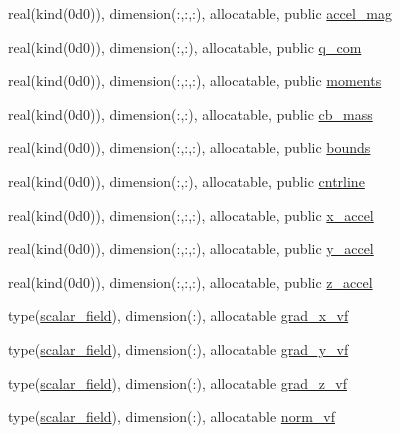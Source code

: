\begin{DoxyCompactItemize}
\item 
real(kind(0d0)), dimension(\+:,\+:,\+:), allocatable, public \hyperlink{namespacem__data__output_a1ccababc9891f8a719df1c52b49e969a}{accel\+\_\+mag}
\item 
real(kind(0d0)), dimension(\+:,\+:), allocatable, public \hyperlink{namespacem__data__output_ac5b476661d64159fdcd7364715495f30}{q\+\_\+com}
\item 
real(kind(0d0)), dimension(\+:,\+:,\+:), allocatable, public \hyperlink{namespacem__data__output_abd8505e33c0dce0f0aba7e27ae53bef5}{moments}
\item 
real(kind(0d0)), dimension(\+:,\+:), allocatable, public \hyperlink{namespacem__data__output_a775b8128a9261b4d095f9132508d309f}{cb\+\_\+mass}
\item 
real(kind(0d0)), dimension(\+:,\+:,\+:), allocatable, public \hyperlink{namespacem__data__output_a1e7a93a0d32bbc7c691381689771b6f9}{bounds}
\item 
real(kind(0d0)), dimension(\+:,\+:), allocatable, public \hyperlink{namespacem__data__output_a4f2a6c0ed44fb82d337013e700479ce5}{cntrline}
\item 
real(kind(0d0)), dimension(\+:,\+:,\+:), allocatable, public \hyperlink{namespacem__data__output_ac465283e56b508af6500bea1ad4c745c}{x\+\_\+accel}
\item 
real(kind(0d0)), dimension(\+:,\+:,\+:), allocatable, public \hyperlink{namespacem__data__output_a9170ca95f1f4493fd30a48052ed214a7}{y\+\_\+accel}
\item 
real(kind(0d0)), dimension(\+:,\+:,\+:), allocatable, public \hyperlink{namespacem__data__output_aef4cabc25090173d5817782631af2781}{z\+\_\+accel}
\item 
type(\hyperlink{structm__derived__types_1_1scalar__field}{scalar\+\_\+field}), dimension(\+:), allocatable \hyperlink{namespacem__data__output_a40d8d6be32c01d80e224dcae55f6ee50}{grad\+\_\+x\+\_\+vf}
\item 
type(\hyperlink{structm__derived__types_1_1scalar__field}{scalar\+\_\+field}), dimension(\+:), allocatable \hyperlink{namespacem__data__output_ac21a93203a6e7e5bc4ffb8c1082440ae}{grad\+\_\+y\+\_\+vf}
\item 
type(\hyperlink{structm__derived__types_1_1scalar__field}{scalar\+\_\+field}), dimension(\+:), allocatable \hyperlink{namespacem__data__output_a5b33b9c60a91e08f0e67da2de15e7d6d}{grad\+\_\+z\+\_\+vf}
\item 
type(\hyperlink{structm__derived__types_1_1scalar__field}{scalar\+\_\+field}), dimension(\+:), allocatable \hyperlink{namespacem__data__output_ae17a432fc2e0bc9f3a0c0614ea1cd6f8}{norm\+\_\+vf}

\end{DoxyCompactItemize}
